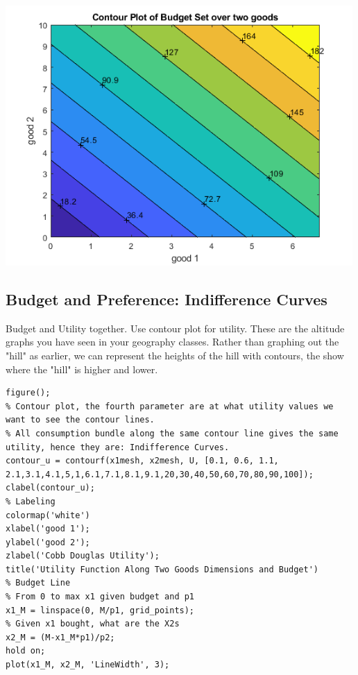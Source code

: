 \documentclass[
]{book}
\begin{document}
\includegraphics[width=5.20833in,height=\textheight]{img/twogoods_images/figure_1.png}

\hypertarget{budget-and-preference-indifference-curves}{%
\subsection{Budget and Preference: Indifference Curves}\label{budget-and-preference-indifference-curves}}

Budget and Utility together. Use contour plot for utility. These are the
altitude graphs you have seen in your geography classes. Rather than
graphing out the "hill" as earlier, we can represent the heights of
the hill with contours, the show where the "hill" is higher and lower.

\begin{verbatim}
figure();
% Contour plot, the fourth parameter are at what utility values we want to see the contour lines. 
% All consumption bundle along the same contour line gives the same utility, hence they are: Indifference Curves.
contour_u = contourf(x1mesh, x2mesh, U, [0.1, 0.6, 1.1, 2.1,3.1,4.1,5,1,6.1,7.1,8.1,9.1,20,30,40,50,60,70,80,90,100]);
clabel(contour_u);
% Labeling
colormap('white')
xlabel('good 1');
ylabel('good 2');
zlabel('Cobb Douglas Utility');
title('Utility Function Along Two Goods Dimensions and Budget')
% Budget Line
% From 0 to max x1 given budget and p1
x1_M = linspace(0, M/p1, grid_points);
% Given x1 bought, what are the X2s
x2_M = (M-x1_M*p1)/p2;
hold on;
plot(x1_M, x2_M, 'LineWidth', 3);
\end{verbatim}
\end{document}
